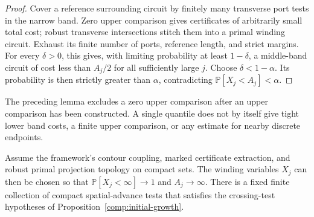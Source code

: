 \begin{proof}
Cover a reference surrounding circuit by finitely many transverse port
tests in the narrow band.  Zero upper comparison gives certificates of
arbitrarily small total cost; robust transverse intersections stitch
them into a primal winding circuit.  Exhaust its finite number of
ports, reference length, and strict margins.  For every $\delta>0$, this
gives, with limiting probability at least $1-\delta$, a middle-band
circuit of cost less than $A_j/2$ for all sufficiently large $j$.
Choose $\delta<1-\alpha$.  Its probability is then strictly greater
than $\alpha$, contradicting
$\mathbb P[X_j<A_j]<\alpha$.
\end{proof}

The preceding lemma excludes a zero upper comparison after an upper
comparison has been constructed.  A single quantile does not by itself
give tight lower band costs, a finite upper comparison, or any estimate
for nearby discrete endpoints.

\begin{lemma}
\label{comp:fk-coarse-tests}
Assume the framework's contour coupling, marked certificate extraction,
and robust primal projection topology on compact sets.  The winding
variables $X_j$ can then be chosen so that
$\mathbb P[X_j<\infty]\to1$ and $A_j\to\infty$.
There is a fixed finite collection of compact spatial-advance tests
that satisfies the crossing-test hypotheses of
Proposition~\ref{comp:initial-growth}.
\end{lemma}

